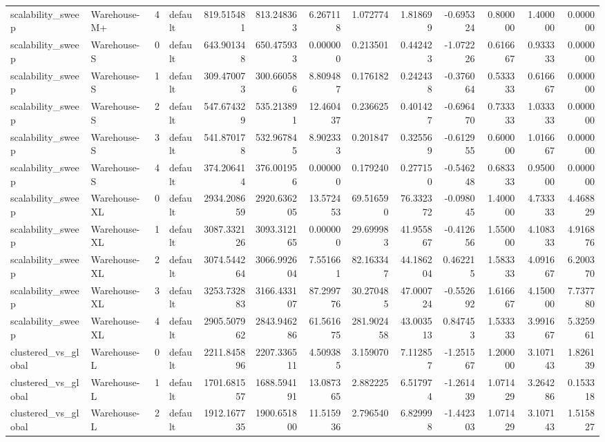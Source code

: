 \begin{tabular}{llrlrrrrrrrrr}
scalability\_sweep & Warehouse-M+ & 4 & default & 819.515481 & 813.248363 & 6.267118 & 1.072774 & 1.818699 & -0.695324 & 0.800000 & 1.400000 & 0.000000 \\
scalability\_sweep & Warehouse-S & 0 & default & 643.901348 & 650.475933 & 0.000000 & 0.213501 & 0.442423 & -1.072226 & 0.616667 & 0.933333 & 0.000000 \\
scalability\_sweep & Warehouse-S & 1 & default & 309.470073 & 300.660586 & 8.809487 & 0.176182 & 0.242438 & -0.376064 & 0.533333 & 0.616667 & 0.000000 \\
scalability\_sweep & Warehouse-S & 2 & default & 547.674329 & 535.213891 & 12.460437 & 0.236625 & 0.401427 & -0.696470 & 0.733333 & 1.033333 & 0.000000 \\
scalability\_sweep & Warehouse-S & 3 & default & 541.870178 & 532.967845 & 8.902333 & 0.201847 & 0.325569 & -0.612955 & 0.600000 & 1.016667 & 0.000000 \\
scalability\_sweep & Warehouse-S & 4 & default & 374.206414 & 376.001956 & 0.000000 & 0.179240 & 0.277150 & -0.546248 & 0.683333 & 0.950000 & 0.000000 \\
scalability\_sweep & Warehouse-XL & 0 & default & 2934.208659 & 2920.636205 & 13.572453 & 69.516590 & 76.332372 & -0.098045 & 1.400000 & 4.733333 & 4.468829 \\
scalability\_sweep & Warehouse-XL & 1 & default & 3087.332126 & 3093.312165 & 0.000000 & 29.699983 & 41.955867 & -0.412656 & 1.550000 & 4.108333 & 4.916876 \\
scalability\_sweep & Warehouse-XL & 2 & default & 3074.544264 & 3066.992604 & 7.551661 & 82.163347 & 44.186204 & 0.462215 & 1.583333 & 4.091667 & 6.200370 \\
scalability\_sweep & Warehouse-XL & 3 & default & 3253.732883 & 3166.433107 & 87.299776 & 30.270485 & 47.000724 & -0.552692 & 1.616667 & 4.150000 & 7.737780 \\
scalability\_sweep & Warehouse-XL & 4 & default & 2905.507962 & 2843.946286 & 61.561675 & 281.902458 & 43.003513 & 0.847453 & 1.533333 & 3.991667 & 5.325961 \\
clustered\_vs\_global & Warehouse-L & 0 & default & 2211.845896 & 2207.336511 & 4.509385 & 3.159070 & 7.112857 & -1.251567 & 1.200000 & 3.107143 & 1.826139 \\
clustered\_vs\_global & Warehouse-L & 1 & default & 1701.681557 & 1688.594191 & 13.087365 & 2.882225 & 6.517974 & -1.261439 & 1.071429 & 3.264286 & 0.153318 \\
clustered\_vs\_global & Warehouse-L & 2 & default & 1912.167735 & 1900.651800 & 11.515936 & 2.796540 & 6.829998 & -1.442303 & 1.071429 & 3.107143 & 1.515827 \\

\end{tabular}
